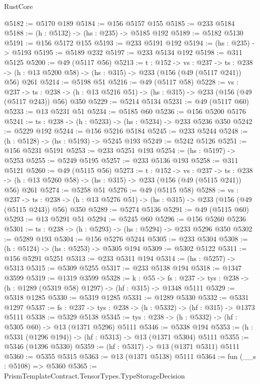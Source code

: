 \begin{lexlean}{RustCore}
\begin{coremodule}
@5182 := @5170 @189
@5184 := @156 @5157 @155
@5185 := @233 @5184
@5188 := (h : @5132) -> (hs : @235) -> @5185 @192
@5189 := @5182 @5130
@5191 := @156 @5172 @155
@5193 := @233 @5191 @192
@5194 := (hs : @235) -> @5193
@5195 := @5189 @232
@5197 := @233 @5134 @192
@5198 := @311 @5125
@5200 := @49 (@5117 @56)
@5213 := {t : @152} ->
  {vs : @237} ->
  {ts : @238} -> (h : @13 @5200 @58) -> (hs : @315) -> @233 (@156 (@49 (@5117 @241)) @56) @261
@5214 := @5198 @51
@5216 := @49 (@5117 @58)
@5228 := {vs : @237} ->
  {ts : @238} -> (h : @13 @5216 @51) -> (hs : @315) -> @233 (@156 (@49 (@5117 @243)) @56) @350
@5229 := @5214 @5134
@5231 := @49 (@5117 @60)
@5233 := @13 @5231 @51
@5234 := @5185 @60
@5236 := @156 @5200 @5176
@5241 := {ts : @238} -> (h : @5233) -> (hs : @5234) -> @233 @5236 @350
@5242 := @5229 @192
@5244 := @156 @5216 @5184
@5245 := @233 @5244
@5248 := (h : @5128) -> (hs : @5193) -> @5245 @193
@5249 := @5242 @5126
@5251 := @156 @5231 @5191
@5253 := @233 @5251 @193
@5254 := (hs : @5197) -> @5253
@5255 := @5249 @5195
@5257 := @233 @5136 @193
@5258 := @311 @5121
@5260 := @49 (@5115 @56)
@5273 := {t : @152} ->
  {vs : @237} ->
  {ts : @238} -> (h : @13 @5260 @58) -> (hs : @315) -> @233 (@156 (@49 (@5115 @241)) @56) @261
@5274 := @5258 @51
@5276 := @49 (@5115 @58)
@5288 := {vs : @237} ->
  {ts : @238} -> (h : @13 @5276 @51) -> (hs : @315) -> @233 (@156 (@49 (@5115 @243)) @56) @350
@5289 := @5274 @5136
@5291 := @49 (@5115 @60)
@5293 := @13 @5291 @51
@5294 := @5245 @60
@5296 := @156 @5260 @5236
@5301 := {ts : @238} -> (h : @5293) -> (hs : @5294) -> @233 @5296 @350
@5302 := @5289 @193
@5304 := @156 @5276 @5244
@5305 := @233 @5304
@5308 := (h : @5124) -> (hs : @5253) -> @5305 @194
@5309 := @5302 @5122
@5311 := @156 @5291 @5251
@5313 := @233 @5311 @194
@5314 := (hs : @5257) -> @5313
@5315 := @5309 @5255
@5317 := @233 @5138 @194
@5318 := @1347 @3599
@5319 := @1319 @3599
@5328 := {k : @55} ->
  {fs : @237} -> {tys : @238} -> (h : @1289 (@5319 @58) @1297) -> (hf : @315) -> @1348 @5111
@5329 := @5318 @1285
@5330 := @5319 @1285
@5331 := @1289 @5330
@5332 := @5331 @1297
@5337 := {fs : @237} -> {tys : @238} -> (h : @5332) -> (hf : @315) -> @1373 @5111
@5338 := @5329 @5138
@5345 := {tys : @238} -> (h : @5332) -> (hf : @5305 @60) -> @13 (@1371 @5296) @5111
@5346 := @5338 @194
@5353 := (h : @5331 (@1296 @194)) -> (hf : @5313) -> @13 (@1371 @5304) @5111
@5355 := @5346 (@1396 @5330)
@5359 := (hf : @5317) -> @13 (@1371 @5311) @5111
@5360 := @5355 @5315
@5363 := @13 (@1371 @5138) @5111
@5364 := fun (__s : @5108) => @5360
@5365 := PrismTemplateContract.TensorTypes.TypeStorageDecision

\end{coremodule}
\end{lexlean}
